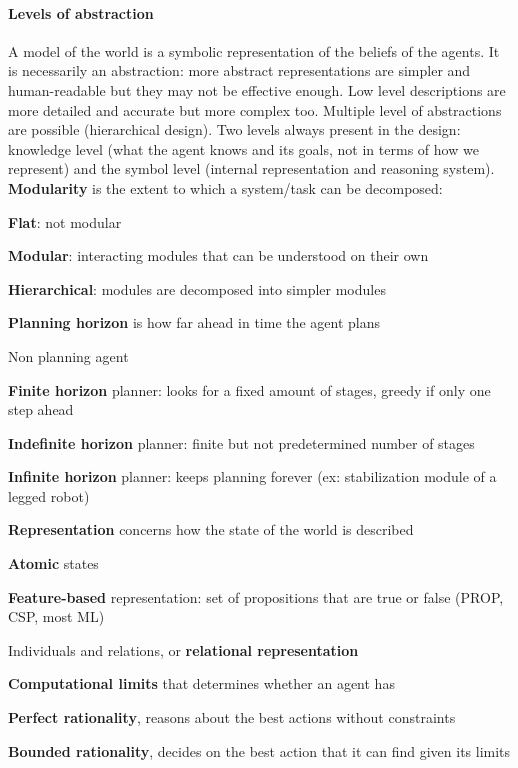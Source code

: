 \documentclass[10pt]{report}
\begin{document}
\paragraph{Levels of abstraction} A model of the world is a symbolic representation of the beliefs of the agents. It is necessarily an abstraction: more abstract representations are simpler and human-readable but they may not be effective enough. Low level descriptions are more detailed and accurate but more complex too. Multiple level of abstractions are possible (hierarchical design). Two levels always present in the design: knowledge level (what the agent knows and its goals, not in terms of how we represent) and the symbol level (internal representation and reasoning system).\\\textbf{Modularity} is the extent to which a system/task can be decomposed: \begin{list}{}{}
	\item \textbf{Flat}: not modular
	\item \textbf{Modular}: interacting modules that can be understood on their own
	\item \textbf{Hierarchical}: modules are decomposed into simpler modules
\end{list}
\textbf{Planning horizon} is how far ahead in time the agent plans \begin{list}{}{}
	\item Non planning agent
	\item \textbf{Finite horizon} planner: looks for a fixed amount of stages, greedy if only one step ahead
	\item \textbf{Indefinite horizon} planner: finite but not predetermined number of stages
	\item \textbf{Infinite horizon} planner: keeps planning forever (ex: stabilization module of a legged robot)
\end{list}
\textbf{Representation} concerns how the state of the world is described \begin{list}{}{}
	\item \textbf{Atomic} states
	\item \textbf{Feature-based} representation: set of propositions that are true or false (PROP, CSP, most ML)
	\item Individuals and relations, or \textbf{relational representation}
\end{list}
\textbf{Computational limits} that determines whether an agent has \begin{list}{}{}
	\item \textbf{Perfect rationality}, reasons about the best actions without constraints
	\item \textbf{Bounded rationality}, decides on the best action that it can find given its limits
\end{list}
\end{document}
